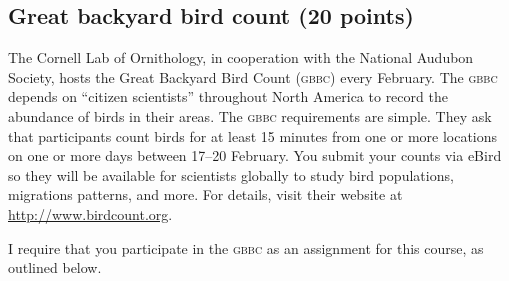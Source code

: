 \documentclass[11pt]{article}
\begin{document}
\thispagestyle{plain}

\subsection*{Great backyard bird count (20 points)}

The Cornell Lab of Ornithology, in cooperation with the National Audubon Society, hosts the Great Backyard Bird Count \textsc{(gbbc)} every February. The \textsc{gbbc} depends on ``citizen scientists'' throughout North America to record the abundance of birds in their areas. The \textsc{gbbc} requirements are simple. They ask that participants count birds for at least 15 minutes from one or more locations on one or more days between 17--20 February. You submit your counts via eBird so they will be available for scientists globally to study bird populations, migrations patterns, and more.  For details, visit their website at \url{http://www.birdcount.org}.\medskip

I require that you participate in the \textsc{gbbc} as an assignment for this course, as outlined below.
\end{document}
